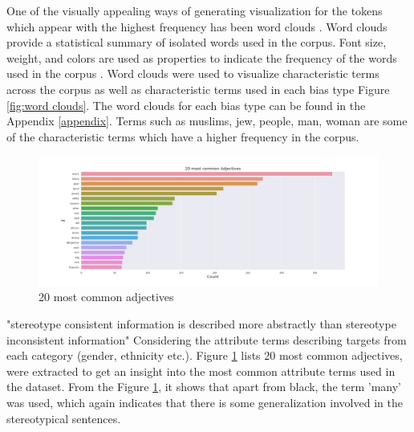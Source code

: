 One of the visually appealing ways of generating visualization for the tokens which appear with the highest frequency has been word clouds \cite{heimerl2014word}. Word clouds provide a statistical summary of isolated words used in the corpus. Font size, weight, and colors are used as properties to indicate the frequency of the words used in the corpus \cite{heimerl2014word}. Word clouds were used to visualize characteristic terms across the corpus as well as characteristic terms used in each bias type Figure \ref{fig:word clouds}. The word clouds for each bias type can be found in the Appendix \ref{appendix}. Terms such as muslims, jew, people, man, woman are some of the characteristic terms which have a higher frequency in the corpus.  

\begin{figure}[]
    \centering
    \includegraphics[width=1\columnwidth]{thesis/figures/20 most common Adjectives.png}
    \caption{20 most common adjectives}
    \label{fig:Common_adj}
\end{figure}

"stereotype consistent information is described more abstractly than stereotype inconsistent information" \cite{wigboldus2005we} Considering the attribute terms describing targets from each category (gender, ethnicity etc.).  Figure \ref{fig:Common_adj} lists 20 most common adjectives, were extracted to get an insight into the most common attribute terms used in the dataset. From the Figure \ref{fig:Common_adj}, it shows that apart from black, the term 'many' was used, which again indicates that there is some generalization involved in the stereotypical sentences.  

